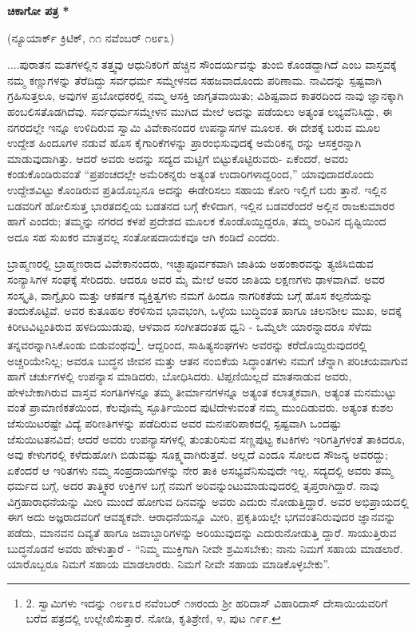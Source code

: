 \begin{center}
\textbf{ಚಿಕಾಗೋ ಪತ್ರ *}
\end{center}

\begin{center}
(ನ್ಯೂಯಾರ್ಕ್ ಕ್ರಿಟಿಕ್, ೧೧ ನವೆಂಬರ್ ೧೮೯೩)
\end{center}

....ಪುರಾತನ ಮತಗಳಲ್ಲಿನ ತತ್ತ್ವವು ಆಧುನಿಕರಿಗೆ ಹೆಚ್ಚಿನ ಸೌಂದರ್ಯವನ್ನು ತುಂಬಿ ಕೊಂಡದ್ದಾಗಿದೆ ಎಂಬ ವಾಸ್ತವಕ್ಕೆ ನಮ್ಮ ಕಣ್ಣುಗಳನ್ನು ತೆರೆದಿದ್ದು ಸರ್ವಧರ್ಮ ಸಮ್ಮೇಳನದ ಸಹಜವಾದೊಂದು ಪರಿಣಾಮ. ನಾವಿದನ್ನು ಸ್ಪಷ್ಟವಾಗಿ ಗ್ರಹಿಸುತ್ತಲೂ, ಅವುಗಳ ಪ್ರಬೋಧಕರಲ್ಲಿ ನಮ್ಮ ಆಸಕ್ತಿ ಜಾಗೃತವಾಯಿತು; ವಿಶಿಷ್ಟವಾದ ಕಾತರದಿಂದ ನಾವು ಜ್ಞಾನಕ್ಕಾಗಿ ಹಂಬಲಿಸತೊಡಗಿದೆವು. ಸರ್ವಧರ್ಮಸಮ್ಮೇಳನ ಮುಗಿದ ಮೇಲೆ ಅದನ್ನು ಪಡೆಯಲು ಅತ್ಯಂತ ಲಭ್ಯವೆನಿಸಿದ್ದು, ಈ ನಗರದಲ್ಲೇ ಇನ್ನೂ ಉಳಿದಿರುವ ಸ್ವಾಮಿ  ವಿವೇಕಾನಂದರ ಉಪನ್ಯಾಸಗಳ ಮೂಲಕ. ಈ ದೇಶಕ್ಕೆ ಬರುವ ಮೂಲ ಉದ್ದೇಶ ಹಿಂದೂಗಳ ನಡುವೆ ಹೊಸ ಕೈಗಾರಿಕೆಗಳನ್ನು ಪ್ರಾರಂಭಿಸುವುದಕ್ಕೆ ಅಮೆರಿಕನ್ನ ರನ್ನು ಆಸಕ್ತರನ್ನಾಗಿ ಮಾಡುವುದಾಗಿತ್ತು. ಆದರೆ ಅವರು ಅದನ್ನು ಸದ್ಯದ ಮಟ್ಟಿಗೆ ಬಿಟ್ಟುಕೊಟ್ಟಿರುವರು- ಏಕೆಂದರೆ, ಅವರು ಕಂಡುಕೊಂಡಿರುವಂತೆ “ಪ್ರಪಂಚದಲ್ಲೇ ಅಮೆರಿಕನ್ನರು ಅತ್ಯಂತ ಉದಾರಿಗಳಾದ್ದರಿಂದ,” ಯಾವುದಾದರೊಂದು ಉದ್ದೇಶವಿಟ್ಟು ಕೊಂಡಿರುವ ಪ್ರತಿಯೊಬ್ಬನೂ ಅದನ್ನು ಈಡೇರಿಸಲು ಸಹಾಯ ಕೋರಿ ಇಲ್ಲಿಗೆ ಬರು ತ್ತಾನೆ. ಇಲ್ಲಿನ ಬಡವರಿಗೆ ಹೋಲಿಸುತ್ತ ಭಾರತದಲ್ಲಿಯ ಬಡತನದ ಬಗ್ಗೆ ಕೇಳಿದಾಗ, ಇಲ್ಲಿನ ಬಡವರೆಂದರೆ ಅಲ್ಲಿನ ರಾಜಕುಮಾರರ ಹಾಗೆ ಎಂದರು; ತಮ್ಮನ್ನು ನಗರದ ಕಳಪೆ ಪ್ರದೇಶದ ಮೂಲಕ ಕೊಂಡೊಯ್ದಿದ್ದರೂ, ತಮ್ಮ ಅರಿವಿನ ದೃಷ್ಟಿಯಿಂದ ಅದೂ ಸಹ ಸುಖಕರ ಮಾತ್ರವಲ್ಲ ಸಂತೋಷದಾಯಕವೂ ಆಗಿ ಕಂಡಿದೆ ಎಂದರು.

ಬ್ರಾಹ್ಮಣರಲ್ಲಿ ಬ್ರಾಹ್ಮಣರಾದ ವಿವೇಕಾನಂದರು, ಇಚ್ಛಾಪೂರ್ವಕವಾಗಿ ಜಾತಿಯ ಅಹಂಕಾರವನ್ನು ತ್ಯಜಿಸಿಬಿಡುವ ಸಂನ್ಯಾಸಿಗಳ ಸಂಘಕ್ಕೆ ಸೇರಿದರು. ಆದರೂ ಅವರ ಮೈ ಮೇಲೆ ಅವರ ಜಾತಿಯ ಲಕ್ಷಣಗಳು ಢಾಳವಾಗಿವೆ. ಅವರ ಸಂಸ್ಕೃತಿ, ವಾಗ್ವೈಖರಿ ಮತ್ತು ಆಕರ್ಷಕ ವ್ಯಕ್ತಿತ್ವಗಳು ನಮಗೆ ಹಿಂದೂ ನಾಗರಿಕತೆಯ ಬಗ್ಗೆ ಹೊಸ ಕಲ್ಪನೆಯನ್ನು ತಂದುಕೊಟ್ಟಿವೆ. ಅವರ ಕುತೂಹಲ ಕೆರಳಿಸುವ ಭಾವಭಂಗಿ, ಒಳ್ಳೆಯ ಬುದ್ಧಿವಂತ ಹಾಗೂ ಚಲನಶೀಲ ಮುಖ, ಅದಕ್ಕೆ ಕಿರೀಟವಿಟ್ಟಂತಿರುವ ಹಳದಿಯುಡುಪು, ಆಳವಾದ ಸಂಗೀತದಂತಹ ಧ್ವನಿ - ಒಮ್ಮೆಲೇ ಯಾರನ್ನಾದರೂ ಸೆಳೆದು ತನ್ನವರನ್ನಾಗಿಸಿಕೊಂಡು ಬಿಡುವಂಥವು\footnote{2. ಸ್ವಾಮಿಗಳು ಇದನ್ನು ೧೮೯೩ರ ನವೆಂಬರ್ ೧೫ರಂದು ಶ‍್ರೀ ಹರಿದಾಸ್ ವಿಹಾರಿದಾಸ್ ದೇಸಾಯಿಯವರಿಗೆ ಬರೆದ ಪತ್ರದಲ್ಲಿ ಉಲ್ಲೇಖಿಸುತ್ತಾರೆ. ನೋಡಿ, ಕೃತಿಶ್ರೇಣಿ, ೪, ಪುಟ ೧೯೯.}. ಆದ್ದರಿಂದ, ಸಾಹಿತ್ಯಸಂಘಗಳು ಅವರನ್ನು ಕರೆದೊಯ್ದಿರುವುದರಲ್ಲಿ ಅಚ್ಚರಿಯೇನಿಲ್ಲ; ಅವರೂ ಬುದ್ಧನ ಜೀವನ ಮತ್ತು ಆತನ ನಂಬಿಕೆಯ ಸಿದ್ಧಾಂತಗಳು ನಮಗೆ ಚೆನ್ನಾಗಿ ಪರಿಚಯವಾಗುವ ಹಾಗೆ ಚರ್ಚುಗಳಲ್ಲಿ ಉಪನ್ಯಾಸ ಮಾಡಿದರು, ಬೋಧಿಸಿದರು. ಟಿಪ್ಪಣಿಯಿಲ್ಲದೆ ಮಾತನಾಡುವ ಅವರು, ಹೇಳಬೇಕಾಗಿರುವ ವಾಸ್ತವ ಸಂಗತಿಗಳನ್ನೂ ತಮ್ಮ ತೀರ್ಮಾನಗಳನ್ನೂ ಅತ್ಯಂತ ಕಲಾತ್ಮಕವಾಗಿ, ಅತ್ಯಂತ ಮನಮುಟ್ಟು ವಂತೆ ಪ್ರಾಮಾಣಿಕತೆಯಿಂದ, ಕೆಲವೊಮ್ಮೆ ಸ್ಫೂರ್ತಿಯಿಂದ ಪುಟಿದೇಳುವಂತೆ ನಮ್ಮ ಮುಂದಿಡುವರು. ಅತ್ಯಂತ ಕುಶಲ ಜೆಸುಯಿಟರಷ್ಟೇ ವಿದ್ಯೆ ಪರಿಣತಿಗಳನ್ನು ಪಡೆದಿರುವ ಅವರ ಮನಃಪರಿಪಾಕದಲ್ಲಿ ಸ್ಪಷ್ಟವಾಗಿ ಒಂದಷ್ಟು ಜೆಸುಯಿಟತನವಿದೆ; ಆದರೆ ಅವರು ಉಪನ್ಯಾಸಗಳಲ್ಲಿ ತುಂತುರಿಸುವ ಸಣ್ಣಪುಟ್ಟ ಕಟಕಿಗಳು ಇರಿಗತ್ತಿಗಳಂತೆ ತಾಕಿದರೂ, ಅವು ಕೇಳುಗರಲ್ಲಿ ಕಳೆದುಹೋಗಿ ಬಿಡುವಷ್ಟು ಸೂಕ್ಷ್ಮವಾಗಿರುತ್ತವೆ. ಅಲ್ಲದೆ ಎಂದೂ ಸೋಲದ ಸೌಜನ್ಯ ಅವರದ್ದು; ಏಕೆಂದರೆ ಆ ಇರಿತಗಳು ನಮ್ಮ ಸಂಪ್ರದಾಯಗಳನ್ನು ನೇರ ತಾಕಿ ಅಸಭ್ಯವೆನಿಸುವುದೇ ಇಲ್ಲ. ಸದ್ಯದಲ್ಲಿ ಅವರು ತಮ್ಮ ಧರ್ಮದ ಬಗ್ಗೆ, ಅದರ ತಾತ್ತ್ವಿಕರ ಉಕ್ತಿಗಳ ಬಗ್ಗೆ ನಮಗೆ ಅರಿವನ್ನುಂಟುಮಾಡುವುದರಲ್ಲಿ ತೃಪ್ತರಾಗಿದ್ದಾರೆ. ನಾವು ವಿಗ್ರಹಾರಾಧನೆಯನ್ನು ಮೀರಿ ಮುಂದೆ ಹೋಗುವ ದಿನವನ್ನು ಅವರು ಎದುರು ನೋಡುತ್ತಿದ್ದಾರೆ. ಅವರ ಅಭಿಪ್ರಾಯದಲ್ಲಿ ಈಗ ಅದು ಅಜ್ಞರಾದವರಿಗೆ ಆವಶ್ಯಕವೇ. ಆರಾಧನೆಯನ್ನೂ ಮೀರಿ, ಪ್ರಕೃತಿಯಲ್ಲೇ ಭಗವಂತನಿರುವುದರ ಜ್ಞಾನವನ್ನು ಪಡೆದು, ಮಾನವನ ದಿವ್ಯತೆ ಹಾಗೂ ಜವಾಬ್ದಾರಿಗಳನ್ನು ಅರಿಯುವುದನ್ನು ಎದುರುನೋಡುತ್ತಿ ದ್ದಾರೆ. ಸಾಯುತ್ತಿರುವ ಬುದ್ಧನೊಡನೆ ಅವರು ಹೇಳುತ್ತಾರೆ - “ನಿಮ್ಮ ಮುಕ್ತಿಗಾಗಿ ನೀವೇ ಶ್ರಮಿಸಬೇಕು; ನಾನು ನಿಮಗೆ ಸಹಾಯ ಮಾಡಲಾರೆ. ಯಾರೊಬ್ಬರೂ ನಿಮಗೆ ಸಹಾಯ ಮಾಡಲಾರರು. ನಿಮಗೆ ನೀವೇ ಸಹಾಯ ಮಾಡಿಕೊಳ್ಳಬೇಕು”.


